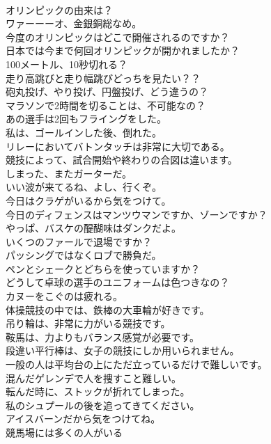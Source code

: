 \documentclass[8pt]{extreport}
\begin{document}
\begin{CJK}{UTF8}{min}
\\	オリンピックの由来は？	
\\	ワァーーーオ、金銀銅総なめ。	
\\	今度のオリンピックはどこで開催されるのですか？	
\\	日本では今まで何回オリンピックが開かれましたか？	
\\	100メートル、10秒切れる？	
\\	走り高跳びと走り幅跳びどっちを見たい？？	
\\	砲丸投げ、やり投げ、円盤投げ、どう違うの？	
\\	マラソンで2時間を切ることは、不可能なの？	
\\	あの選手は2回もフライングをした。	
\\	私は、ゴールインした後、倒れた。	
\\	リレーにおいてバトンタッチは非常に大切である。	
\\	競技によって、試合開始や終わりの合図は違います。	
\\	しまった、またガーターだ。	
\\	いい波が来てるね、よし、行くぞ。	
\\	今日はクラゲがいるから気をつけて。	
\\	今日のディフェンスはマンツウマンですか、ゾーンですか？	
\\	やっぱ、バスケの醍醐味はダンクだよ。	
\\	いくつのファールで退場ですか？	
\\	パッシングではなくロブで勝負だ。	
\\	ペンとシェークとどちらを使っていますか？	
\\	どうして卓球の選手のユニフォームは色つきなの？	
\\	カヌーをこぐのは疲れる。	
\\	体操競技の中では、鉄棒の大車輪が好きです。	
\\	吊り輪は、非常に力がいる競技です。	
\\	鞍馬は、力よりもバランス感覚が必要です。	
\\	段違い平行棒は、女子の競技にしか用いられません。	
\\	一般の人は平均台の上にただ立っているだけで難しいです。	
\\	混んだゲレンデで人を捜すこと難しい。	
\\	転んだ時に、ストックが折れてしまった。	
\\	私のシュプールの後を追ってきてください。	
\\	アイスバーンだから気をつけてね。	
\\	競馬場には多くの人がいる	

\end{CJK}
\end{document}
